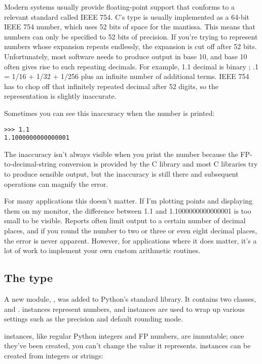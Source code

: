 \documentclass{howto}
\begin{document}
Modern systems usually provide floating-point support that conforms to
a relevant standard called IEEE 754.  C's  type is
usually implemented as a 64-bit IEEE 754 number, which uses 52 bits of
space for the mantissa.  This means that numbers can only be specified
to 52 bits of precision.  If you're trying to represent numbers whose
expansion repeats endlessly, the expansion is cut off after 52 bits.
Unfortunately, most software needs to produce output in base 10, and
base 10 often gives rise to such repeating decimals.  For example, 1.1
decimal is binary ; .1 = 1/16 + 1/32 + 1/256
plus an infinite number of additional terms.  IEEE 754 has to chop off
that infinitely repeated decimal after 52 digits, so the
representation is slightly inaccurate.  

Sometimes you can see this inaccuracy when the number is printed:
\begin{verbatim}
>>> 1.1
1.1000000000000001
\end{verbatim}

The inaccuracy isn't always visible when you print the number because
the FP-to-decimal-string conversion is provided by the C library and
most C libraries try to produce sensible output, but the inaccuracy is
still there and subsequent operations can magnify the error.

For many applications this doesn't matter.  If I'm plotting points and
displaying them on my monitor, the difference between 1.1 and
1.1000000000000001 is too small to be visible.  Reports often limit
output to a certain number of decimal places, and if you round the
number to two or three or even eight decimal places, the error is
never apparent.  However, for applications where it does matter, 
it's a lot of work to implement your own custom arithmetic routines.

\subsection{The  type}

A new module, , was added to Python's standard library.
It contains two classes,  and .
 instances represent numbers, and
 instances are used to wrap up various settings such as the precision and default rounding mode.

 instances, like regular Python integers and FP numbers, are immutable; once they've been created, you can't change the value it represents.  
 instances can be created from integers or strings:
\end{document}
